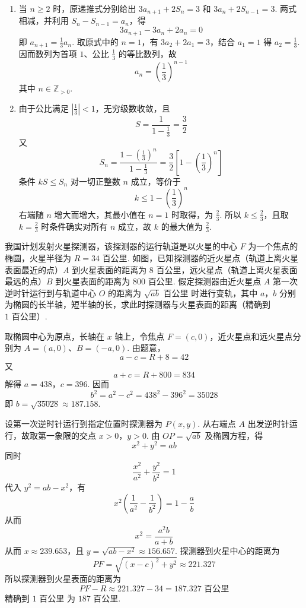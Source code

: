 \begin{solution}
\begin{enumerate}
\item 当 \(n\geqslant2\) 时，原递推式分别给出 \(3a_{n+1}+2S_n=3\) 和 \(3a_n+2S_{n-1}=3\). 两式相减，并利用 \(S_n-S_{n-1}=a_n\)，得
\[
3a_{n+1}-3a_n+2a_n=0
\]
即 \(a_{n+1}=\frac13a_n\). 取原式中的 \(n=1\)，有 \(3a_2+2a_1=3\)，结合 \(a_1=1\) 得 \(a_2=\frac13\). 因而数列为首项 \(1\)、公比 \(\frac13\) 的等比数列，故
\[
a_n=\left(\frac13\right)^{n-1}
\]
其中 \(n\in\mathbb Z_{>0}\).
\item 由于公比满足 \(\left|\frac13\right|<1\)，无穷级数收敛，且
\[
S=\frac{1}{1-\frac13}=\frac32
\]
又
\[
S_n=\frac{1-\left(\frac13\right)^n}{1-\frac13}=\frac32\left[1-\left(\frac13\right)^n\right]
\]
条件 \(kS\leqslant S_n\) 对一切正整数 \(n\) 成立，等价于
\[
k\leqslant1-\left(\frac13\right)^n
\]
右端随 \(n\) 增大而增大，其最小值在 \(n=1\) 时取得，为 \(\frac23\). 所以 \(k\leqslant\frac23\)，且取 \(k=\frac23\) 时条件确实对所有 \(n\) 成立，故 \(k\) 的最大值为 \(\frac23\).
\end{enumerate}
\end{solution}

\begin{problem}

我国计划发射火星探测器，该探测器的运行轨道是以火星的中心 \(F\) 为一个焦点的椭圆，火星半径为 \(R=34\text{ 百公里}\). 如图，已知探测器的近火星点（轨道上离火星表面最近的点）\(A\) 到火星表面的距离为 \(8\text{ 百公里}\)，远火星点（轨道上离火星表面最远的点）\(B\) 到火星表面的距离为 \(800\text{ 百公里}\). 假定探测器由近火星点 \(A\) 第一次逆时针运行到与轨道中心 \(O\) 的距离为 \(\sqrt{ab}\text{ 百公里}\) 时进行变轨，其中 \(a\)，\(b\) 分别为椭圆的长半轴，短半轴的长，求此时探测器与火星表面的距离（精确到 \(1\text{ 百公里}\)）.

\end{problem}

\begin{solution}
取椭圆中心为原点，长轴在 \(x\) 轴上，令焦点 \(F=(c,0)\)，近火星点和远火星点分别为 \(A=(a,0)\)、\(B=(-a,0)\). 由题意，
\[
a-c=R+8=42
\]
又
\[
a+c=R+800=834
\]
解得 \(a=438\)，\(c=396\). 因而
\[
b^2=a^2-c^2=438^2-396^2=35028
\]
即 \(b=\sqrt{35028}\approx187.158\).

设第一次逆时针运行到指定位置时探测器为 \(P(x,y)\). 从右端点 \(A\) 出发逆时针运行，故取第一象限的交点 \(x>0\)，\(y>0\). 由 \(OP=\sqrt{ab}\) 及椭圆方程，得
\[
x^2+y^2=ab
\]
同时
\[
\frac{x^2}{a^2}+\frac{y^2}{b^2}=1
\]
代入 \(y^2=ab-x^2\)，有
\[
x^2\left(\frac1{a^2}-\frac1{b^2}\right)=1-\frac ab
\]
从而
\[
x^2=\frac{a^2b}{a+b}
\]
从而 \(x\approx239.653\)，且 \(y=\sqrt{ab-x^2}\approx156.657\).
探测器到火星中心的距离为
\[
PF=\sqrt{(x-c)^2+y^2}\approx221.327
\]
所以探测器到火星表面的距离为
\[
PF-R\approx221.327-34=187.327\text{ 百公里}
\]
精确到 \(1\text{ 百公里}\) 为 \(187\text{ 百公里}\).
\end{solution}

